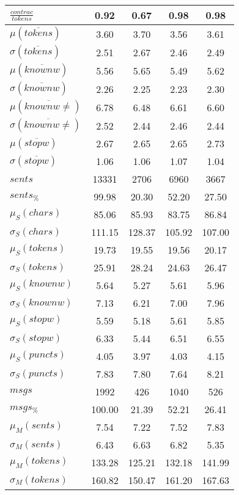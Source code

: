 \begin{table}[h!]
\begin{center}
\begin{tabular}{| l || c | c | c | c |}
$\frac{contrac}{tokens}$ & 0.92  & 0.67  & 0.98  & 0.98 \\\hline\hline
$\mu(\overline{tokens})$ & 3.60  & 3.70  & 3.56  & 3.61 \\
$\sigma(\overline{tokens})$ & 2.51  & 2.67  & 2.46  & 2.49 \\\hline
$\mu(\overline{knownw})$ & 5.56  & 5.65  & 5.49  & 5.62 \\
$\sigma(\overline{knownw})$ & 2.26  & 2.25  & 2.23  & 2.30 \\\hline
$\mu(\overline{knownw \neq})$ & 6.78  & 6.48  & 6.61  & 6.60 \\
$\sigma(\overline{knownw \neq})$ & 2.52  & 2.44  & 2.46  & 2.44 \\\hline
$\mu(\overline{stopw})$ & 2.67  & 2.65  & 2.65  & 2.73 \\
$\sigma(\overline{stopw})$ & 1.06  & 1.06  & 1.07  & 1.04 \\\hline\hline
$sents$ & 13331  & 2706  & 6960  & 3667 \\
$sents_{\%}$ & 99.98  & 20.30  & 52.20  & 27.50 \\\hline
$\mu_S(chars)$ & 85.06  & 85.93  & 83.75  & 86.84 \\
$\sigma_S(chars)$ & 111.15  & 128.37  & 105.92  & 107.00 \\\hline
$\mu_S(tokens)$ & 19.73  & 19.55  & 19.56  & 20.17 \\
$\sigma_S(tokens)$ & 25.91  & 28.24  & 24.63  & 26.47 \\\hline
$\mu_S(knownw)$ & 5.64  & 5.27  & 5.61  & 5.96 \\
$\sigma_S(knownw)$ & 7.13  & 6.21  & 7.00  & 7.96 \\\hline
$\mu_S(stopw)$ & 5.59  & 5.18  & 5.61  & 5.85 \\
$\sigma_S(stopw)$ & 6.33  & 5.44  & 6.51  & 6.55 \\\hline
$\mu_S(puncts)$ & 4.05  & 3.97  & 4.03  & 4.15 \\
$\sigma_S(puncts)$ & 7.83  & 7.80  & 7.64  & 8.21 \\\hline\hline
$msgs$ & 1992  & 426  & 1040  & 526 \\
$msgs_{\%}$ & 100.00  & 21.39  & 52.21  & 26.41 \\\hline
$\mu_M(sents)$ & 7.54  & 7.22  & 7.52  & 7.83 \\
$\sigma_M(sents)$ & 6.43  & 6.63  & 6.82  & 5.35 \\\hline
$\mu_M(tokens)$ & 133.28  & 125.21  & 132.18  & 141.99 \\
$\sigma_M(tokens)$ & 160.82  & 150.47  & 161.20  & 167.63 \\\hline

\end{tabular}
\end{center}
\end{table}
